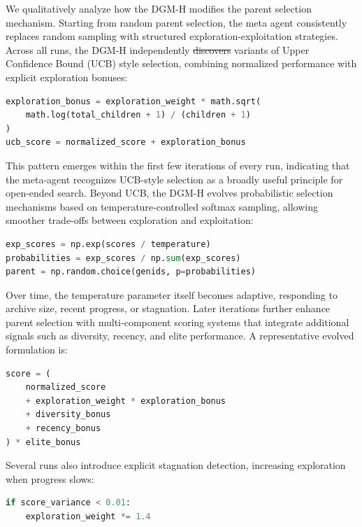 \documentclass[]{fairmeta}
\providecommand{\DIFaddtex}[1]{{\protect\color{blue}\uwave{#1}}} %
\providecommand{\DIFdeltex}[1]{{\protect\color{red}\sout{#1}}}                      %
\providecommand{\DIFaddbegin}{} %
\providecommand{\DIFaddend}{} %
\providecommand{\DIFdelbegin}{} %
\providecommand{\DIFdelend}{} %
\providecommand{\DIFadd}[1]{\texorpdfstring{\DIFaddtex{#1}}{#1}} %
\providecommand{\DIFdel}[1]{\texorpdfstring{\DIFdeltex{#1}}{}} %
\begin{document}
We qualitatively analyze how the DGM-H modifies the parent selection mechanism. Starting from random parent selection, the meta agent consistently replaces random sampling with structured exploration-exploitation strategies. Across all runs, the DGM-H independently \DIFdelbegin \DIFdel{discovers }\DIFdelend \DIFaddbegin \DIFadd{creates }\DIFaddend variants of Upper Confidence Bound (UCB) \DIFaddbegin \DIFadd{\mbox{%
\citep{auer2002finite} }\hskip0pt%
}\DIFaddend style selection, combining normalized performance with explicit exploration bonuses:
\begin{lstlisting}[language=Python]
exploration_bonus = exploration_weight * math.sqrt(
    math.log(total_children + 1) / (children + 1)
)
ucb_score = normalized_score + exploration_bonus
\end{lstlisting}
This pattern emerges within the first few iterations of every run, indicating that the meta-agent recognizes UCB-style selection as a broadly useful principle for open-ended search. Beyond UCB, the DGM-H evolves probabilistic selection mechanisms based on temperature-controlled softmax sampling, allowing smoother trade-offs between exploration and exploitation:
\begin{lstlisting}[language=Python]
exp_scores = np.exp(scores / temperature)
probabilities = exp_scores / np.sum(exp_scores)
parent = np.random.choice(genids, p=probabilities)
\end{lstlisting}
Over time, the temperature parameter itself becomes adaptive, responding to archive size, recent progress, or stagnation. Later iterations further enhance parent selection with multi-component scoring systems that integrate additional signals such as diversity, recency, and elite performance. A representative evolved formulation is:
\begin{lstlisting}[language=Python]
score = (
    normalized_score
    + exploration_weight * exploration_bonus
    + diversity_bonus
    + recency_bonus
) * elite_bonus
\end{lstlisting}
Several runs also introduce explicit stagnation detection, increasing exploration when progress slows:
\begin{lstlisting}[language=Python]
if score_variance < 0.01:
    exploration_weight *= 1.4
\end{lstlisting}
\end{document}
